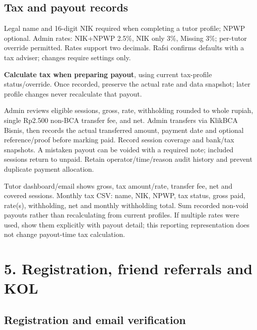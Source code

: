 \documentclass[11pt,a4paper]{article}
\begin{document}
\subsection*{Tax and payout records}

Legal name and 16-digit NIK required when completing a tutor profile; NPWP optional. Admin rates: NIK+NPWP 2.5\%, NIK only 3\%, Missing 3\%; per-tutor override permitted. Rates support two decimals. Rafsi confirms defaults with a tax adviser; changes require settings only.

\textbf{Calculate tax when preparing payout}, using current tax-profile status/\allowbreak{}override. Once recorded, preserve the actual rate and data snapshot; later profile changes never recalculate that payout.

Admin reviews eligible sessions, gross, rate, withholding rounded to whole rupiah, single Rp2.500 non-BCA transfer fee, and net. Admin transfers via KlikBCA Bisnis, then records the actual transferred amount, payment date and optional reference/\allowbreak{}proof before marking paid. Record session coverage and bank/\allowbreak{}tax snapshots. A mistaken payout can be voided with a required note; included sessions return to unpaid. Retain operator/\allowbreak{}time/\allowbreak{}reason audit history and prevent duplicate payment allocation.

Tutor dashboard/\allowbreak{}email shows gross, tax amount/\allowbreak{}rate, transfer fee, net and covered sessions. Monthly tax CSV: name, NIK, NPWP, tax status, gross paid, rate(s), withholding, net and monthly withholding total. Sum recorded non-void payouts rather than recalculating from current profiles. If multiple rates were used, show them explicitly with payout detail; this reporting representation does not change payout-time tax calculation.

\section*{5. Registration, friend referrals and KOL}

\subsection*{Registration and email verification}
\end{document}
